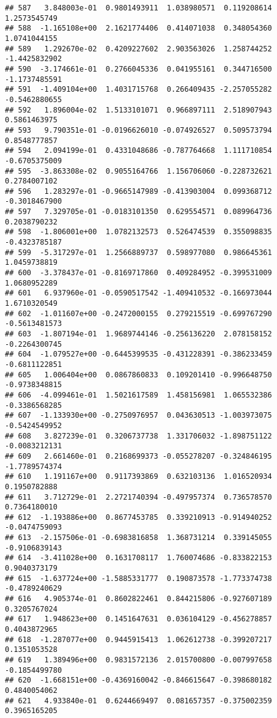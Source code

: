 \documentclass[
]{article}
\begin{document}
\begin{verbatim}
## 587   3.848003e-01  0.9801493911  1.038980571  0.119208614  1.2573545749
## 588  -1.165108e+00  2.1621774406  0.414071038  0.348054360  1.0741044155
## 589   1.292670e-02  0.4209227602  2.903563026  1.258744252 -1.4425832902
## 590  -3.174661e-01  0.2766045336  0.041955161  0.344716500 -1.1737485591
## 591  -1.409104e+00  1.4031715768  0.266409435 -2.257055282 -0.5462880655
## 592   1.896004e-02  1.5133101071  0.966897111  2.518907943  0.5861463975
## 593   9.790351e-01 -0.0196626010 -0.074926527  0.509573794  0.8548777857
## 594   2.094199e-01  0.4331048686 -0.787764668  1.111710854 -0.6705375009
## 595  -3.863308e-02  0.9055164766  1.156706060 -0.228732621  0.2784007102
## 596   1.283297e-01 -0.9665147989 -0.413903004  0.099368712 -0.3018467900
## 597   7.329705e-01 -0.0183101350  0.629554571  0.089964736  0.2038790232
## 598  -1.806001e+00  1.0782132573  0.526474539  0.355098835 -0.4323785187
## 599  -5.317297e-01  1.2566889737  0.598977080  0.986645361  1.0459738819
## 600  -3.378437e-01 -0.8169717860  0.409284952 -0.399531009  1.0680952289
## 601   6.937960e-01 -0.0590517542 -1.409410532 -0.166973044  1.6710320549
## 602  -1.011607e+00 -0.2472000155  0.279215519 -0.699767290 -0.5613481573
## 603  -1.807194e-01  1.9689744146 -0.256136220  2.078158152 -0.2264300745
## 604  -1.079527e+00 -0.6445399535 -0.431228391 -0.386233459 -0.6811122851
## 605   1.006404e+00  0.0867860833  0.109201410 -0.996648750 -0.9738348815
## 606  -4.099461e-01  1.5021617589  1.458156981  1.065532386 -0.3386568285
## 607  -1.133930e+00 -0.2750976957  0.043630513 -1.003973075 -0.5424549952
## 608   3.827239e-01  0.3206737738  1.331706032 -1.898751122 -0.0083212131
## 609   2.661460e-01  0.2168699373 -0.055278207 -0.324846195 -1.7789574374
## 610   1.191167e+00  0.9117393869  0.632103136  1.016520934  0.1950782888
## 611   3.712729e-01  2.2721740394 -0.497957374  0.736578570  0.7364180010
## 612  -1.193886e+00  0.8677453785  0.339210913 -0.914940252 -0.0474759093
## 613  -2.157506e-01 -0.6983816858  1.368731214  0.339145055 -0.9106839143
## 614  -3.411028e+00  0.1631708117  1.760074686 -0.833822153  0.9040373179
## 615  -1.637724e+00 -1.5885331777  0.190873578 -1.773374738 -0.4789240629
## 616   4.905374e-01  0.8602822461  0.844215806 -0.927607189  0.3205767024
## 617   1.948623e+00  0.1451647631  0.036104129 -0.456278857  0.4043872965
## 618  -1.287077e+00  0.9445915413  1.062612738 -0.399207217  0.1351053528
## 619   1.389496e+00  0.9831572136  2.015700800 -0.007997658 -0.1854499780
## 620  -1.668151e+00 -0.4369160042 -0.846615647 -0.398680182  0.4840054062
## 621   4.933840e-01  0.6244669497  0.081657357 -0.375002359  0.3965165205

\end{verbatim}
\end{document}
